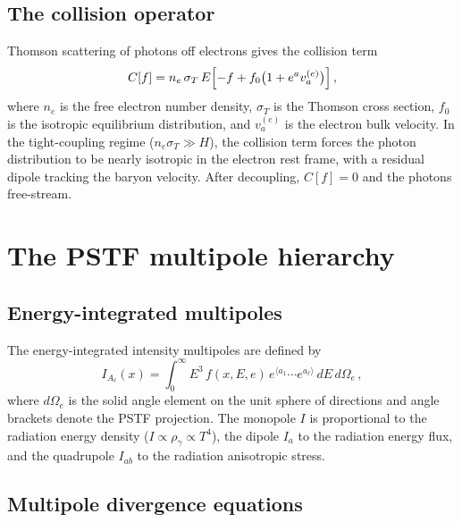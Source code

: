 \subsection{The collision operator}\label{sec:collision}

Thomson scattering of photons off electrons gives the collision
term
\begin{equation}\label{eq:thomson}
C[f] = n_e\,\sigma_T\,E\Bigl[
  -f + f_0\bigl(1 + e^a v_a^{(e)}\bigr)
\Bigr]\,,
\end{equation}
where $n_e$ is the free electron number density, $\sigma_T$ is
the Thomson cross section, $f_0$ is the isotropic equilibrium
distribution, and $v_a^{(e)}$ is the electron bulk velocity.
In the tight-coupling regime ($n_e\sigma_T \gg H$), the
collision term forces the photon distribution to be nearly
isotropic in the electron rest frame, with a residual dipole
tracking the baryon velocity.  After decoupling, $C[f] = 0$
and the photons free-stream.


\section{The PSTF multipole hierarchy}\label{sec:pstf-hierarchy}

\subsection{Energy-integrated multipoles}\label{sec:energy-int}

The energy-integrated intensity multipoles are defined by
\begin{equation}\label{eq:I-multipole}
I_{A_\ell}(x)
= \int_0^\infty E^3\,f(x, E, e)\,
  e^{\langle a_1}\cdots e^{a_\ell\rangle}\,dE\,d\Omega_e\,,
\end{equation}
where $d\Omega_e$ is the solid angle element on the unit sphere
of directions and angle brackets denote the PSTF projection.
The monopole $I$ is proportional to the radiation energy density
($I \propto \rho_\gamma \propto T^4$), the dipole $I_a$ to the
radiation energy flux, and the quadrupole $I_{ab}$ to the
radiation anisotropic stress.


\subsection{Multipole divergence equations}
\label{sec:MDE}

